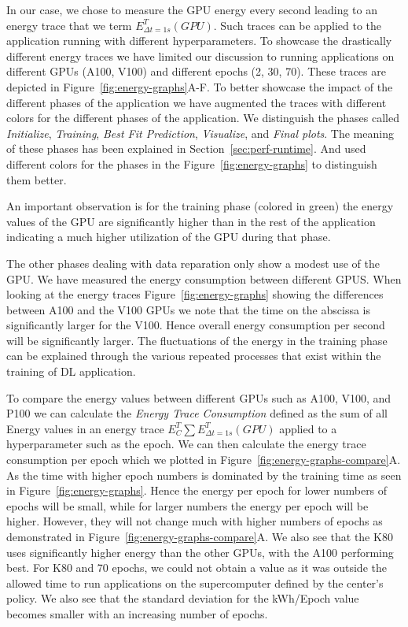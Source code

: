 \documentclass[utf8]{FrontiersinVancouver} %
\newcommand{\TODO}[2]{\todo[inline]{{\bf \color{red} #1} #2}}
\begin{document}
In our case, we chose to measure the GPU energy every second leading to an energy trace that we term $E^T_{\Delta t=1s}(GPU)$. Such traces can be applied to the application running with different hyperparameters. To showcase the drastically different energy traces we have limited our discussion to running applications on different GPUs (A100, V100) and different epochs (2, 30, 70). These traces are depicted in Figure~\ref{fig:energy-graphs}A-F.  To better showcase the impact of the different phases of the application we have augmented the traces with different colors for the different phases of the application.  We distinguish the phases called {\em Initialize}, {\em Training}, {\em Best Fit Prediction}, {\em Visualize}, and {\em Final plots}. The meaning of these phases has been explained in Section~\ref{sec:perf-runtime}. And used different colors for the phases in the Figure~\ref{fig:energy-graphs} to distinguish them better.

An important observation is for the training phase (colored in green) the energy values of the GPU are significantly higher than in the rest of the application indicating a much higher utilization of the GPU during that phase.

The other phases dealing with data reparation only show a modest use of the GPU. We have measured the energy consumption between different GPUS.  When looking at the energy traces Figure~\ref{fig:energy-graphs} showing the differences between A100 and the V100 GPUs we note that the time on the abscissa is significantly larger for the V100. Hence overall energy consumption per second will be significantly larger. The fluctuations of the energy in the training phase can be explained through the various repeated processes that exist within the training of DL application.


To compare the energy values between different GPUs such as A100, V100, and P100 we can calculate the {\em Energy Trace Consumption} defined as the sum of all Energy values in an energy trace $E^T_C \sum E^T_{\Delta t=1s}(GPU)$ applied to a hyperparameter such as the epoch.  We can then calculate the energy trace consumption per epoch which we plotted in Figure~\ref{fig:energy-graphs-compare}A.  As the time with higher epoch numbers is dominated by the training time as seen in Figure~\ref{fig:energy-graphs}.  Hence the energy per epoch for lower numbers of epochs will be small, while for larger numbers the energy per epoch will be higher. However, they will not change much with higher numbers of epochs as demonstrated in Figure~\ref{fig:energy-graphs-compare}A.  We also see that the K80 uses significantly higher energy than the other GPUs, with the A100 performing best. For K80 and 70 epochs, we could not obtain a value as it was outside the allowed time to run applications on the supercomputer defined by the center's policy.  We also see that the standard deviation for the kWh/Epoch value becomes smaller with an increasing number of epochs.
\end{document}
